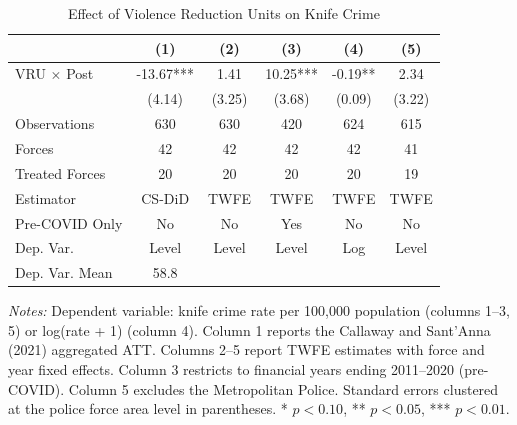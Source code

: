 \begin{table}[htbp]
\centering
\caption{Effect of Violence Reduction Units on Knife Crime}
\label{tab:main}
\begin{threeparttable}
\begin{tabular}{lccccc}
\toprule
 & (1) & (2) & (3) & (4) & (5) \\
\midrule
VRU $\times$ Post & -13.67*** & 1.41 & 10.25*** & -0.19** & 2.34 \\
 & (4.14) & (3.25) & (3.68) & (0.09) & (3.22) \\
[0.5em]
Observations & 630 & 630 & 420 & 624 & 615 \\
Forces & 42 & 42 & 42 & 42 & 41 \\
Treated Forces & 20 & 20 & 20 & 20 & 19 \\
Estimator & CS-DiD & TWFE & TWFE & TWFE & TWFE \\
Pre-COVID Only & No & No & Yes & No & No \\
Dep. Var. & Level & Level & Level & Log & Level \\
Dep. Var. Mean & 58.8 & & & & \\
\bottomrule
\end{tabular}
\begin{tablenotes}[flushleft]\footnotesize
\item \textit{Notes:} Dependent variable: knife crime rate per 100,000 population (columns 1--3, 5) or log(rate + 1) (column 4). Column 1 reports the Callaway and Sant'Anna (2021) aggregated ATT. Columns 2--5 report TWFE estimates with force and year fixed effects. Column 3 restricts to financial years ending 2011--2020 (pre-COVID). Column 5 excludes the Metropolitan Police. Standard errors clustered at the police force area level in parentheses. * $p < 0.10$, ** $p < 0.05$, *** $p < 0.01$.
\end{tablenotes}
\end{threeparttable}
\end{table}

